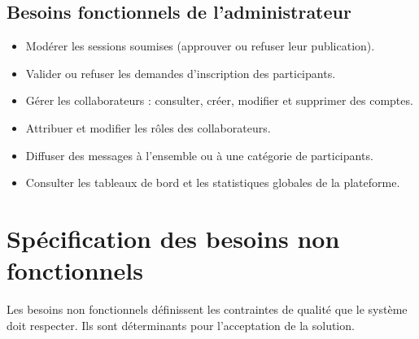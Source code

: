 \documentclass[12pt,a4paper,oneside]{report}
\begin{document}
\subsection{Besoins fonctionnels de l'administrateur}
\begin{itemize}[leftmargin=1.2cm]
  \item Modérer les sessions soumises (approuver ou refuser leur publication).
  \item Valider ou refuser les demandes d'inscription des participants.
  \item Gérer les collaborateurs : consulter, créer, modifier et supprimer des comptes.
  \item Attribuer et modifier les rôles des collaborateurs.
  \item Diffuser des messages à l'ensemble ou à une catégorie de participants.
  \item Consulter les tableaux de bord et les statistiques globales de la plateforme.
\end{itemize}

\section{Spécification des besoins non fonctionnels}
Les besoins non fonctionnels définissent les contraintes de qualité que le système doit
respecter. Ils sont déterminants pour l'acceptation de la solution.
\end{document}
